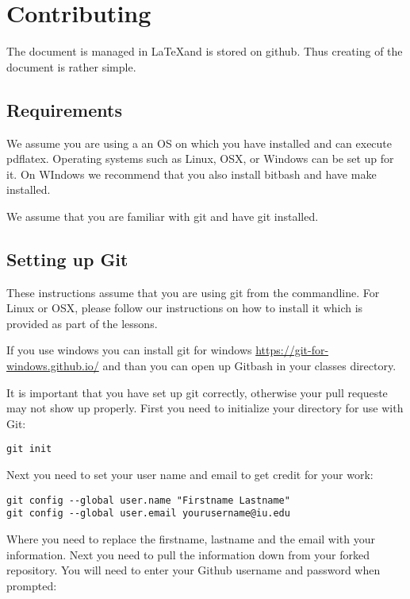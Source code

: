 

\section{Contributing}\label{S:contributing}

\FILENAME

The document is managed in \LaTeX and is stored on github. Thus
creating of the document is rather simple.

\subsection{Requirements}

We assume you are using a an OS on which you have installed and can
execute pdflatex. Operating systems such as Linux, OSX, or Windows can
be set up for it. On WIndows we recommend that you also install
bitbash and have  make installed.

We assume that you are familiar with git and have git installed.

\subsection{Setting up Git}

These instructions assume that you are using git from the commandline.
For Linux or OSX, please follow our instructions on how to install it
which is provided as part of the lessons.

If you use windows you can install
git for windows \url{https://git-for-windows.github.io/}
and than you can open up Gitbash in your classes directory.

It is important that you have set up git correctly, otherwise your
pull requeste may not show up properly.  First you need to initialize
your directory for use with Git:

\begin{verbatim}
git init
\end{verbatim}

Next you need to set your user name and email to get credit for your
work:

\begin{verbatim}
git config --global user.name "Firstname Lastname"
git config --global user.email yourusername@iu.edu
\end{verbatim}


Where you need to replace the firstname, lastname and the email with
your information. Next you need to pull the information down from your
forked repository.  You will need to enter your Github username and
password when prompted:


